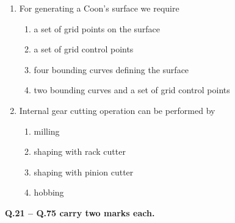 \documentclass[journal,12pt,onecolumn]{IEEEtran}
\begin{document}
\begin{enumerate}
    \item For generating a Coon's surface we require
          \begin{enumerate}
              \item a set of grid points on the surface
              \item a set of grid control points
              \item four bounding curves defining the surface
              \item two bounding curves and a set of grid control points
          \end{enumerate}

    \item Internal gear cutting operation can be performed by
          \begin{enumerate}
              \item milling
              \item shaping with rack cutter
              \item shaping with pinion cutter
              \item hobbing
          \end{enumerate}
          \pagebreak
\end{enumerate}
\large\textbf{Q.21 -- Q.75 carry two marks each.}\\
\end{document}
